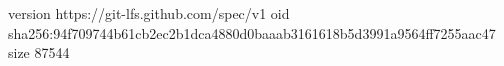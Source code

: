 version https://git-lfs.github.com/spec/v1
oid sha256:94f709744b61cb2ec2b1dca4880d0baaab3161618b5d3991a9564ff7255aac47
size 87544
